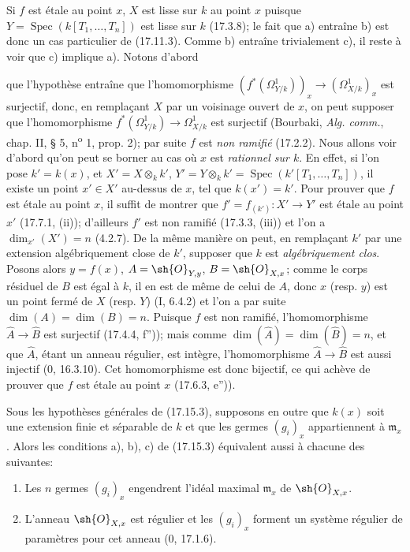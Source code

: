 Si $f$ est étale au point $x$, $X$ est lisse sur $k$ au point $x$ puisque $Y=\operatorname{Spec}(k[T_1,\ldots,T_n])$ est lisse sur $k$ (17.3.8); le fait que a) entraîne b) est donc un cas particulier de (17.11.3). Comme b) entraîne trivialement c), il reste à voir que c) implique a). Notons d'abord


que l'hypothèse entraîne que l'homomorphisme $(f^*(\Omega^1_{Y/k}))_x\to(\Omega^1_{X/k})_x$ est surjectif, donc, en remplaçant $X$ par un voisinage ouvert de $x$, on peut supposer que l'homomorphisme $f^*(\Omega^1_{Y/k})\to\Omega^1_{X/k}$ est surjectif (Bourbaki, \emph{Alg. comm.}, chap. II, § 5, n\textsuperscript{o} 1, prop. 2); par suite $f$ est \emph{non ramifié} (17.2.2). Nous allons voir d'abord qu'on peut se borner au cas où $x$ est \emph{rationnel sur $k$}. En effet, si l'on pose $k'=k(x)$, et $X'=X\otimes_k k'$, $Y'=Y\otimes_k k'=\operatorname{Spec}(k'[T_1,\ldots,T_n])$, il existe un point $x'\in X'$ au-dessus de $x$, tel que $k(x')=k'$. Pour prouver que $f$ est étale au point $x$, il suffit de montrer que $f'=f_{(k')}:X'\to Y'$ est étale au point $x'$ (17.7.1, (ii)); d'ailleurs $f'$ est non ramifié (17.3.3, (iii)) et l'on a $\dim_{x'}(X')=n$ (4.2.7). De la même manière on peut, en remplaçant $k'$ par une extension algébriquement close de $k'$, supposer que $k$ est \emph{algébriquement clos}. Posons alors $y=f(x)$, $A=\sh{O}_{Y,y}$, $B=\sh{O}_{X,x}$; comme le corps résiduel de $B$ est égal à $k$, il en est de même de celui de $A$, donc $x$ (resp. $y$) est un point fermé de $X$ (resp. $Y$) (I, 6.4.2) et l'on a par suite $\dim(A)=\dim(B)=n$. Puisque $f$ est non ramifié, l'homomorphisme $\widehat A\to\widehat B$ est surjectif (17.4.4, f'')); mais comme $\dim(\widehat A)=\dim(\widehat B)=n$, et que $\widehat A$, étant un anneau régulier, est intègre, l'homomorphisme $\widehat A\to\widehat B$ est aussi injectif (0, 16.3.10). Cet homomorphisme est donc bijectif, ce qui achève de prouver que $f$ est étale au point $x$ (17.6.3, e'')).

\begin{corollary}[17.15.4]
\label{IV.17.15.4}
Sous les hypothèses générales de (17.15.3), supposons en outre que $k(x)$ soit une extension finie et séparable de $k$ et que les germes $(g_i)_x$ appartiennent à $\mathfrak m_x$. Alors les conditions a), b), c) de (17.15.3) équivalent aussi à chacune des suivantes:
\begin{enumerate}
  \item[d)] Les $n$ germes $(g_i)_x$ engendrent l'idéal maximal $\mathfrak m_x$ de $\sh{O}_{X,x}$.
  \item[d')] L'anneau $\sh{O}_{X,x}$ est régulier et les $(g_i)_x$ forment un système régulier de paramètres pour cet anneau (0, 17.1.6).
\end{enumerate}
\end{corollary}

